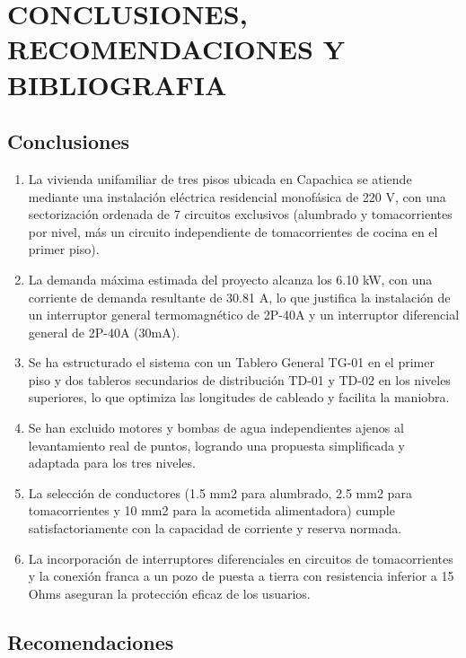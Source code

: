 \chapter{CONCLUSIONES, RECOMENDACIONES Y BIBLIOGRAFIA}

\section{Conclusiones}

\begin{enumerate}
  \item La vivienda unifamiliar de tres pisos ubicada en Capachica se atiende mediante una instalación eléctrica residencial monofásica de 220 V, con una sectorización ordenada de 7 circuitos exclusivos (alumbrado y tomacorrientes por nivel, más un circuito independiente de tomacorrientes de cocina en el primer piso).
  \item La demanda máxima estimada del proyecto alcanza los 6.10 kW, con una corriente de demanda resultante de 30.81 A, lo que justifica la instalación de un interruptor general termomagnético de 2P-40A y un interruptor diferencial general de 2P-40A (30mA).
  \item Se ha estructurado el sistema con un Tablero General TG-01 en el primer piso y dos tableros secundarios de distribución TD-01 y TD-02 en los niveles superiores, lo que optimiza las longitudes de cableado y facilita la maniobra.
  \item Se han excluido motores y bombas de agua independientes ajenos al levantamiento real de puntos, logrando una propuesta simplificada y adaptada para los tres niveles.
  \item La selección de conductores (1.5 mm2 para alumbrado, 2.5 mm2 para tomacorrientes y 10 mm2 para la acometida alimentadora) cumple satisfactoriamente con la capacidad de corriente y reserva normada.
  \item La incorporación de interruptores diferenciales en circuitos de tomacorrientes y la conexión franca a un pozo de puesta a tierra con resistencia inferior a 15 Ohms aseguran la protección eficaz de los usuarios.
\end{enumerate}

\section{Recomendaciones}


